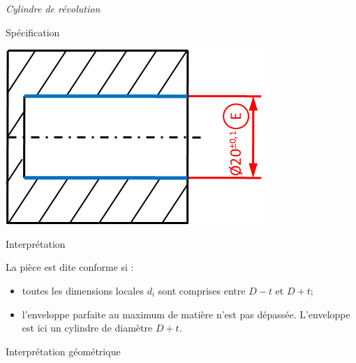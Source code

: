 \documentclass[11pt,oneside]{article}
\begin{document}
\begin{exemple}
\textit{Cylindre de révolution}

\begin{minipage}[t]{.3\linewidth}
\begin{center}
Spécification

\includegraphics[width=.95\textwidth]{png/linE_cyl}
\end{center}
\end{minipage} \hfill
\begin{minipage}[t]{.3\linewidth}
\begin{center}
Interprétation
\end{center}
La pièce est dite conforme si :
\begin{itemize}
\item toutes les dimensions locales $d_i$ sont comprises entre $D-t$ et $D+t$;
\item l'enveloppe parfaite au maximum de matière n'est pas dépassée. L'enveloppe est ici un cylindre de diamètre $D+t$.
\end{itemize}

\end{minipage} \hfill
\begin{minipage}[t]{.3\linewidth}
\begin{center}
Interprétation géométrique

\end{center}
\end{minipage}

\end{exemple}

\newpage
\end{document}
